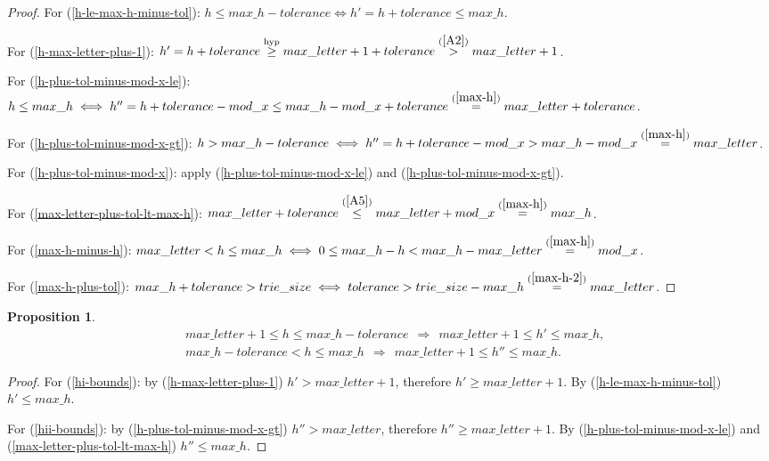 \documentclass[a4paper,9pt,leqno]{article}
\renewcommand{\=}{\protect\nobreakdash-\hspace{0pt}}
\renewcommand{\~}{\protect\nobreakdash--\hspace{0pt}}
\theoremstyle{plain}
\newtheorem{prop}[fact]{Proposition}
\theoremstyle{definition}
\theoremstyle{remark}
\newcommand{\impll}{\:\:\Longrightarrow\:\:}
\newcommand{\impl}{\impll}%
\newcommand{\parref}[1]{(\ref{#1})}
\newcommand{\by}[1]{{#1}}
\newcommand{\byhyp}{\by{hyp}}
\newcommand{\symby}[2]{\stackrel{#1}{{#2}}}
\newcommand{\symbyrm}[2]{\symby{{\rm\scriptstyle{#1}}}{#2}}
\newcommand{\eqby}[1]{\symbyrm{#1}{=}}
\newcommand{\eqbyref}[1]{\eqby{\parref{#1}}}
\newcommand{\leby}[1]{\symbyrm{#1}{\le}}
\newcommand{\lebyref}[1]{\leby{\parref{#1}}}
\newcommand{\geby}[1]{\symbyrm{#1}{\geq}}
\newcommand{\gebyhyp}{\geby{\byhyp}}
\newcommand{\gt}{>}
\newcommand{\gtby}[1]{\symbyrm{#1}{\gt}}
\newcommand{\gtbyref}[1]{\gtby{\parref{#1}}}
\newcommand{\lt}{<}
\begin{document}
\begin{proof}
For \parref{h-le-max-h-minus-tol}: $h \le max\_h - tolerance
\iff h' = h + tolerance \le max\_h$.

For \parref{h-max-letter-plus-1}: $h' = h + tolerance
\gebyhyp max\_letter + 1 + tolerance
\gtbyref{A2} max\_letter + 1$.

For \parref{h-plus-tol-minus-mod-x-le}: $h \le max\_h
\iff h'' = h + tolerance - mod\_x \le max\_h - mod\_x + tolerance
\eqbyref{max-h} max\_letter + tolerance$.

For \parref{h-plus-tol-minus-mod-x-gt}: $h \gt max\_h - tolerance
\iff h'' = h + tolerance - mod\_x \gt max\_h - mod\_x
\eqbyref{max-h} max\_letter$.

For \parref{h-plus-tol-minus-mod-x}: apply \parref{h-plus-tol-minus-mod-x-le}
and \parref{h-plus-tol-minus-mod-x-gt}.

For \parref{max-letter-plus-tol-lt-max-h}: $max\_letter + tolerance
\lebyref{A5} max\_letter + mod\_x
\eqbyref{max-h} max\_h$. 

For \parref{max-h-minus-h}: $max\_letter \lt h \le max\_h
\iff 0 \le max\_h - h \lt max\_h - max\_letter
\eqbyref{max-h} mod\_x$.

For \parref{max-h-plus-tol}: $max\_h + tolerance \gt trie\_size
\iff tolerance \gt trie\_size - max\_h
\eqbyref{max-h-2} max\_letter$. 
\end{proof}

\begin{prop}
\begin{align}
& max\_letter + 1 \le h \le max\_h - tolerance \impl max\_letter + 1 \le h' \le max\_h,
                                                             \label{hi-bounds}\\
%
& max\_h - tolerance \lt h \le max\_h \impl max\_letter + 1 \le h'' \le max\_h.
                                                             \label{hii-bounds}
\end{align}
\end{prop}

\begin{proof}
For \parref{hi-bounds}: by \parref{h-max-letter-plus-1} $h' \gt max\_letter + 1$,
therefore $h' \ge max\_letter + 1$. By \parref{h-le-max-h-minus-tol} $h' \le max\_h$.

For \parref{hii-bounds}: by \parref{h-plus-tol-minus-mod-x-gt} $h'' \gt max\_letter$,
therefore $h'' \ge max\_letter + 1$. By \parref{h-plus-tol-minus-mod-x-le} and
\parref{max-letter-plus-tol-lt-max-h} $h'' \le max\_h$.
\end{proof}
\end{document}
